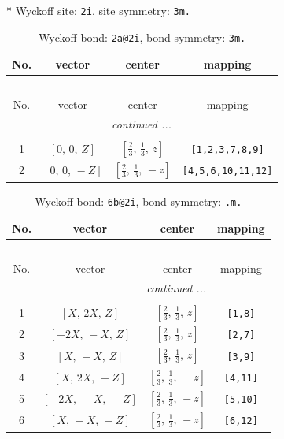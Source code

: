 \documentclass[fleqn,8pt]{jsarticle}
\begin{document}
* Wyckoff site: {\tt 2i}, site symmetry: {\tt 3m.}
\renewcommand{\arraystretch}{1.2}
\begin{longtable}{cccc}
\caption{Wyckoff bond: {\tt 2a@2i}, bond symmetry: {\tt 3m.}}
 \\
 \hline \hline
No. & vector & center & mapping \\ \hline \endfirsthead

\multicolumn{3}{l}{\tablename\ \thetable{}} \\
 \hline \hline
No. & vector & center & mapping \\ \hline \endhead

 \hline \hline
\multicolumn{3}{r}{\footnotesize\it continued ...} \\ \endfoot

 \hline \hline
\multicolumn{3}{r}{} \\ \endlastfoot

1 & $\left[ 0,\, 0,\, Z \right]$ & $\left[ \frac{2}{3},\, \frac{1}{3},\, z \right]$ & {\tt [1,2,3,7,8,9]} \\ \hline
2 & $\left[ 0,\, 0,\, - Z \right]$ & $\left[ \frac{2}{3},\, \frac{1}{3},\, - z \right]$ & {\tt [4,5,6,10,11,12]} \\
\end{longtable}
\renewcommand{\arraystretch}{1.2}
\begin{longtable}{cccc}
\caption{Wyckoff bond: {\tt 6b@2i}, bond symmetry: {\tt .m.}}
 \\
 \hline \hline
No. & vector & center & mapping \\ \hline \endfirsthead

\multicolumn{3}{l}{\tablename\ \thetable{}} \\
 \hline \hline
No. & vector & center & mapping \\ \hline \endhead

 \hline \hline
\multicolumn{3}{r}{\footnotesize\it continued ...} \\ \endfoot

 \hline \hline
\multicolumn{3}{r}{} \\ \endlastfoot

1 & $\left[ X,\, 2 X,\, Z \right]$ & $\left[ \frac{2}{3},\, \frac{1}{3},\, z \right]$ & {\tt [1,8]} \\ \hline
2 & $\left[ - 2 X,\, - X,\, Z \right]$ & $\left[ \frac{2}{3},\, \frac{1}{3},\, z \right]$ & {\tt [2,7]} \\ \hline
3 & $\left[ X,\, - X,\, Z \right]$ & $\left[ \frac{2}{3},\, \frac{1}{3},\, z \right]$ & {\tt [3,9]} \\ \hline
4 & $\left[ X,\, 2 X,\, - Z \right]$ & $\left[ \frac{2}{3},\, \frac{1}{3},\, - z \right]$ & {\tt [4,11]} \\ \hline
5 & $\left[ - 2 X,\, - X,\, - Z \right]$ & $\left[ \frac{2}{3},\, \frac{1}{3},\, - z \right]$ & {\tt [5,10]} \\ \hline
6 & $\left[ X,\, - X,\, - Z \right]$ & $\left[ \frac{2}{3},\, \frac{1}{3},\, - z \right]$ & {\tt [6,12]} \\
\end{longtable}
\end{document}
